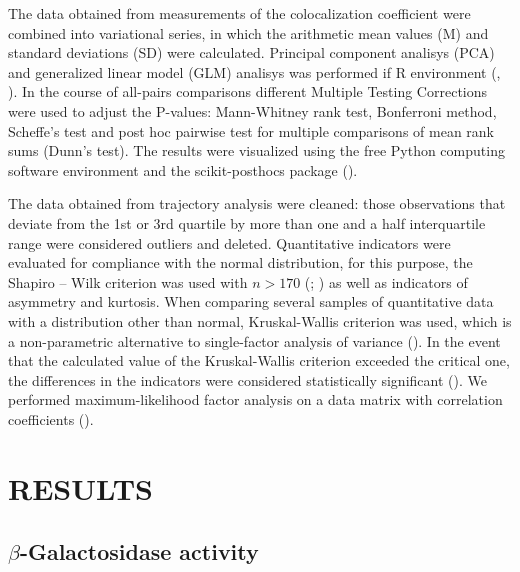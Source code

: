 \documentclass[english,authoryear]{elsarticle}
\begin{document}
The data obtained from measurements of the colocalization coefficient were combined into variational series, in which the arithmetic mean values (M) and standard deviations (SD) were calculated.
Principal component analisys (PCA)  and generalized linear model (GLM) analisys was performed if R environment (\cite{husson2010exploratory}, \cite{dobson2008introduction}).
In the course of all-pairs comparisons different Multiple Testing Corrections were used to adjust the P-values: Mann-Whitney rank test, Bonferroni method, Scheffe’s test and post hoc pairwise test for multiple comparisons of mean rank sums (Dunn’s test).
The results were visualized using the free Python computing software environment and the scikit-posthocs package (\cite{Terpilowski2019}).


The data obtained from trajectory analysis were cleaned: those observations that deviate from the 1st or 3rd quartile by more than one and a half interquartile range were considered outliers and deleted.
Quantitative indicators were evaluated for compliance with the normal distribution, for this purpose, the Shapiro – Wilk criterion  was used with $n > 170$ (\cite{shapiro1965analysis}; \cite{shapiro1972approximate}) as well as indicators of asymmetry and kurtosis.
When comparing several samples of quantitative data with a distribution other than normal, Kruskal-Wallis criterion was used, which is a non-parametric alternative to single-factor analysis of variance (\cite{kruskal1952use}).
In the event that the calculated value of the Kruskal-Wallis criterion exceeded the critical one, the differences in the indicators were considered statistically significant (\cite{wilcoxon1992individual}).
We performed maximum-likelihood factor analysis on a data matrix with correlation coefficients (\cite{lawley1971factor}).




\subsubsection{}



\section{RESULTS}

\subsection{$\beta$-Galactosidase activity}
\end{document}
